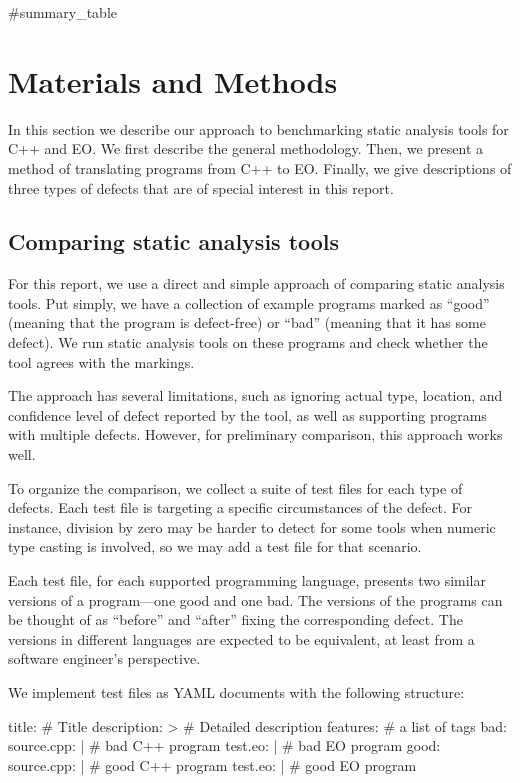 #summary_table

\section{Materials and Methods}

In this section we describe our approach to benchmarking static analysis tools for C++ and EO. We first describe the general methodology. Then, we present a method of translating programs from C++ to EO. Finally, we give descriptions of three types of defects that are of special interest in this report.

\subsection{Comparing static analysis tools}

For this report, we use a direct and simple approach of comparing static analysis tools. Put simply, we have a collection of example programs marked as ``good'' (meaning that the program is defect-free) or ``bad'' (meaning that it has some defect). We run static analysis tools on these programs and check whether the tool agrees with the markings.

The approach has several limitations, such as ignoring actual type, location, and confidence level of defect reported by the tool, as well as supporting programs with multiple defects. However, for preliminary comparison, this approach works well.

To organize the comparison, we collect a suite of test files for each type of defects. Each test file is targeting a specific circumstances of the defect. For instance, division by zero may be harder to detect for some tools when numeric type casting is involved, so we may add a test file for that scenario.

Each test file, for each supported programming language, presents two similar versions of a program---one good and one bad. The versions of the programs can be thought of as ``before'' and ``after'' fixing the corresponding defect. The versions in different languages are expected to be equivalent, at least from a software engineer's perspective.

We implement test files as YAML documents with the following structure:

\begin{ffcode}
title: # Title
description: >
  # Detailed description
features: # a list of tags
bad:
  source.cpp: |
    # bad C++ program
  test.eo: |
    # bad EO program
good:
  source.cpp: |
    # good C++ program
  test.eo: |
    # good EO program
\end{ffcode}

